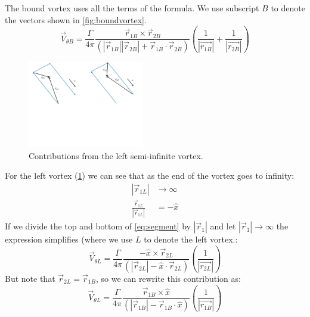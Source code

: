 \documentclass{article}
\begin{document}
The bound vortex uses all the terms of the formula. We use subscript $B$ to denote the vectors shown in \cref{fig:boundvortex}.
\begin{equation}
\vec{V}_{\theta B} = \frac{\Gamma}{4 \pi} \frac{\vec{r}_{1B} \times \vec{r}_{2B}}{(|\vec{r}_{1B}||\vec{r}_{2B}| + \vec{r}_{1B} \cdot \vec{r}_{2B})} \left(\frac{1}{|\vec{r_{1B}}|} + \frac{1}{|\vec{r_{2B}}|} \right)
\end{equation}

\begin{figure}[htbp]
\centering
\includegraphics[width=2in]{figs/leftvortex}
\caption{Contributions from the left semi-infinite vortex.}
\label{fig:leftvortex}
\end{figure}

For the left vortex (\cref{fig:leftvortex})
we can see that as the end of the vortex goes to infinity:
\begin{align}
|\vec{r}_{1L}| &\rightarrow \infty\\
\frac{\vec{r}_{1L}}{|\vec{r}_{1L}|} &= -\hat{x}
\end{align}
If we divide the top and bottom of \cref{eq:segment} by $|\vec{r}_1|$ and let $|\vec{r}_1| \rightarrow \infty$ the expression simplifies (where we use $L$ to denote the left vortex.:
\begin{equation}
\vec{V}_{\theta L} = \frac{\Gamma}{4 \pi} \frac{-\hat{x} \times \vec{r}_{2L}}{(|\vec{r}_{2L}| - \hat{x} \cdot \vec{r}_{2L})} \left(\frac{1}{|\vec{r_{2L}}|} \right)
\end{equation}
But note that $\vec{r}_{2L} = \vec{r}_{1B}$, so we can rewrite this contribution as:
\begin{equation}
\vec{V}_{\theta L} = \frac{\Gamma}{4 \pi} \frac{\vec{r}_{1B} \times \hat{x}}{(|\vec{r}_{1B}| - \vec{r}_{1B} \cdot \hat{x})} \left(\frac{1}{|\vec{r_{1B}}|} \right)
\end{equation}
\end{document}
